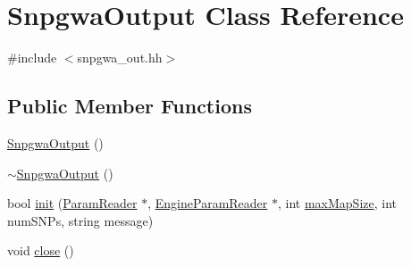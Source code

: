 \hypertarget{classSnpgwaOutput}{
\section{SnpgwaOutput Class Reference}
\label{classSnpgwaOutput}
}


{\ttfamily \#include $<$snpgwa\_\-out.hh$>$}

\subsection*{Public Member Functions}
\begin{DoxyCompactItemize}
\item 
\hyperlink{classSnpgwaOutput_a422139dc18d6a32d36312e35a40a9a1c}{SnpgwaOutput} ()
\item 
\hyperlink{classSnpgwaOutput_af599a28d1b3e2e0b08152c4da3fe5474}{$\sim$SnpgwaOutput} ()
\item 
bool \hyperlink{classSnpgwaOutput_a52e7ec60c5feb78958b62702c5b82918}{init} (\hyperlink{classParamReader}{ParamReader} $\ast$, \hyperlink{classEngineParamReader}{EngineParamReader} $\ast$, int \hyperlink{classSnpgwaOutput_a5c90c26d5435ed4a5315312c8b6fabe5}{maxMapSize}, int numSNPs, string message)
\item 
void \hyperlink{classSnpgwaOutput_a7994a4d439344d2f2839686eba5b0251}{close} ()
\end{DoxyCompactItemize}
